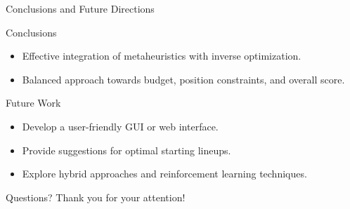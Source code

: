 \documentclass{beamer}
\begin{document}
	\begin{frame}{Conclusions and Future Directions}
		\begin{block}{Conclusions}
			\begin{itemize}
				\item Effective integration of metaheuristics with inverse optimization.
				\item Balanced approach towards budget, position constraints, and overall score.
			\end{itemize}
		\end{block}
		\begin{block}{Future Work}
			\begin{itemize}
				\item Develop a user-friendly GUI or web interface.
				\item Provide suggestions for optimal starting lineups.
				\item Explore hybrid approaches and reinforcement learning techniques.
			\end{itemize}
		\end{block}
	\end{frame}
	
	\begin{frame}{Questions?}
		\centering
		\Large Thank you for your attention!
	\end{frame}
	
\end{document}
